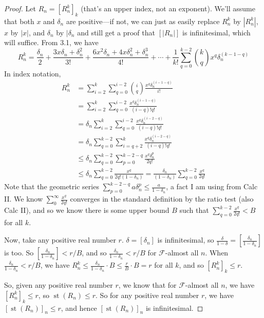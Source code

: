 \documentclass{article}
\DeclareMathOperator{\st}{st}
\theoremstyle{definition}
\begin{document}
\begin{proof}
    Let $R_n = [R_n^k]_k$ (that's an upper index, not an exponent). We'll assume that both $x$ and $\delta_n$ are positive---if not, we can just as easily replace $R_n^k$ by $|R_n^k|$, $x$ by $|x|$, and $\delta_n$ by $|\delta_n$ and still get a proof that $[|R_n|]$ is infinitesimal, which will suffice. From 3.1, we have 
    \[ R_n^k = \frac{\delta_n}{2} + \frac{3x\delta_n + \delta_n^2}{3!} + \frac{6x^2\delta_n + 4x\delta_n^2 + \delta_n^3}{4!} + \cdots + \frac{1}{k!}\sum_{q=0}^{k-2}\binom{k}{q}x^q\delta_n^{(k-1-q)}\]
    In index notation,
    \begin{align*}
        R_n^k &= \sum_{i=2}^k \sum_{q=0}^{i-2}\binom{i}{q}\frac{x^q\delta_n^{(i-1-q)}}{i!} \\
        &= \sum_{i=2}^k \sum_{q=0}^{i-2}\frac{x^q\delta_n^{(i-1-q)}}{(i-q)!q!} \\
        &= \delta_n \sum_{i=2}^k \sum_{q=0}^{i-2} \frac{x^{q}\delta_n^{(i-2-q)}}{(i-q)!q!} \\
        &= \delta_n \sum_{q=0}^{k-2}\sum_{i=q+2}^k \frac{x^{q}\delta_n^{(i-2-q)}}{(i-q)!q!} \\
        &\leq \delta_n \sum_{q=0}^{k-2} \sum_{p=0}^{k-2-q} \frac{x^q\delta_n^p}{2q!} \\
        &\leq \delta_n \sum_{q=0}^{k-2} \frac{x^q}{2q!(1-\delta_n)} = \frac{\delta_n}{(1-\delta_n)}\sum_{q=0}^{k-2} \frac{x^q}{2q!}
    \end{align*}
    Note that the geometric series $\sum_{p=0}^{k-2-q} a\delta_n^p \leq \frac{a}{1 - \delta_n}$, a fact I am using from Calc II. We know $\sum_0^\infty \frac{x^q}{2q!}$ converges in the standard definition by the ratio test (also Calc II), and so we know there is some upper bound $B$ such that $\sum_{q=0}^{k-2} \frac{x^q}{2q!} < B$ for all $k$.

    Now, take any positive real number $r$. $\delta = [\delta_n]$ is infinitesimal, so $\frac{\delta}{1 - \delta} = \left[\frac{\delta_n}{1-\delta_n}\right]$ is too. So $\left[\frac{\delta_n}{1-\delta_n}\right] < r/B$, and so $\frac{\delta_n}{1-\delta_n} < r/B$ for $\mathcal{F}$-almost all $n$. When $\frac{\delta_n}{1-\delta_n} < r/B$, we have $R_n^k \leq \frac{\delta_n}{1-\delta_n} \cdot B \leq \frac{r}{B} \cdot B = r$ for all $k$, and so $[R_n^k]_k \leq r$.

    So, given any positive real number $r$, we know that for $\mathcal{F}$-almost all $n$, we have $[R_n^k]_k \leq r$, so $\st(R_n) \leq r$. So for any positive real number $r$, we have $[\st(R_n)]_n \leq r$, and hence $[\st(R_n)]_n$ is infinitesimal.
\end{proof}
\end{document}
